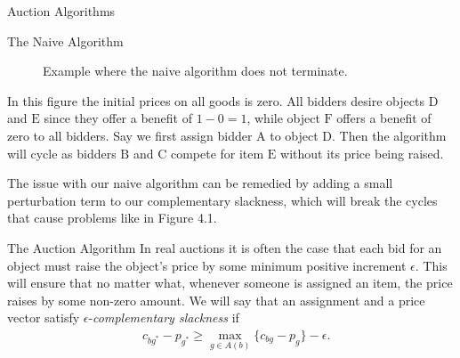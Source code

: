 \begin{section}{Auction Algorithms}
\begin{subsection}{The Naive Algorithm}
\begin{figure}[h]
			\caption{Example where the naive algorithm does not terminate.} 
		\end{figure}
		In this figure the initial prices on all goods is zero. All bidders desire objects 
		$\mbox{D}$ and $\mbox{E}$ since they offer a benefit of $1-0 = 1$, while object 
		$\mbox{F}$ offers a benefit 
		of zero to all bidders. Say we first assign bidder $\mbox{A}$ to object $\mbox{D}$. 
		Then the algorithm 
		will cycle as bidders $\mbox{B}$ and $\mbox{C}$ compete for item $\mbox{E}$ without 
		its price being raised.

		The issue with our naive algorithm can be remedied by adding a small perturbation term 
		to our complementary slackness, which will break the cycles that cause problems like in 
		Figure 4.1.
	\end{subsection}
	\begin{subsection}{The Auction Algorithm}
		In real auctions it is often the case that each bid for an object must raise the 
		object's price by some minimum positive increment $\epsilon$. 
		This will ensure that no matter what, whenever someone 
		is assigned an item, the price raises by some non-zero amount. We will say that 
		an assignment and a price vector satisfy $\epsilon$-\emph{complementary 
		slackness} if 
		\begin{align}
			& c_{bg^{*}} - p_{g^{*}} \geq \max_{g\in A(b)} \{c_{bg} - p_g\} - \epsilon.
		\end{align}


\end{subsection}
\end{section}
